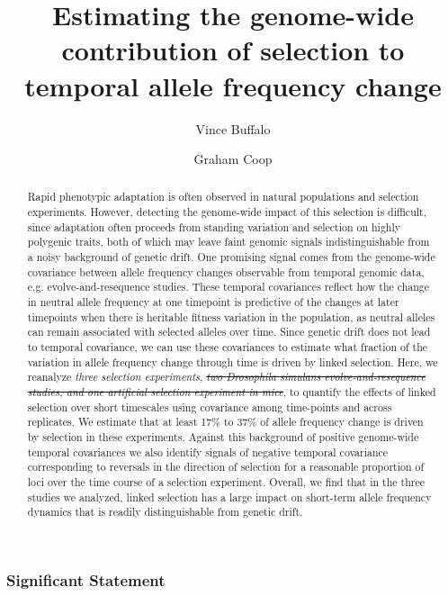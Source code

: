 \documentclass[11pt]{article}
\title{Estimating the genome-wide contribution of selection to temporal allele frequency change}
\author[$\ast$,$\dag$,$1$]{Vince Buffalo}
\author[$\dag$]{Graham Coop}
\affil[$\ast$]{\footnotesize Population Biology Graduate Group}
\affil[$\dag$]{\footnotesize Center for Population Biology, Department of Evolution and Ecology, University of California, Davis, CA 95616}
\affil[$1$]{\footnotesize Email for correspondence: \href{mailto:vsbuffalo@ucdavis.edu}{vsbuffalo@ucdavis.edu}}
\newcommand{\vb}[1]{{\it \color{blue} #1}}
\newcommand{\vbout}[1]{{\it \color{blue} \sout{#1}}}
\begin{document}
\maketitle

\linenumbers

\begin{abstract}

 Rapid phenotypic adaptation is often observed in natural populations and
 selection experiments.  However, detecting the genome-wide impact of this
 selection is difficult, since adaptation often proceeds from standing
 variation and selection on highly polygenic traits, both of which may leave
 faint genomic signals indistinguishable from a noisy background of genetic
 drift.  One promising signal comes from the genome-wide covariance between
 allele frequency changes observable from temporal genomic data, e.g.
 evolve-and-resequence studies. These temporal covariances reflect how the
 change in neutral allele frequency at one timepoint is predictive of the
 changes at later timepoints when there is heritable fitness variation in the
 population, as neutral alleles can remain associated with selected alleles
 over time. Since genetic drift does not lead to temporal covariance, we can
 use these covariances to estimate what fraction of the variation in allele
 frequency change through time is driven by linked selection. Here, we
 reanalyze \vb{three selection experiments}, \vbout{two \emph{Drosophila
   simulans} evolve-and-resequence studies, and one artificial selection
 experiment in mice}, to quantify the effects of linked selection over short
 timescales using covariance among time-points and across replicates. We
 estimate that at least 17\% to 37\% of allele frequency change is driven by
 selection in these experiments.  Against this background of positive
 genome-wide temporal covariances we also identify signals of negative temporal
 covariance corresponding to reversals in the direction of selection for a
 reasonable proportion of loci over the time course of a selection experiment.
 Overall, we find that in the three studies we analyzed, linked selection has a
 large impact on short-term allele frequency dynamics that is readily
 distinguishable from genetic drift.

\end{abstract}

\subsubsection*{Significant Statement}
\end{document}
